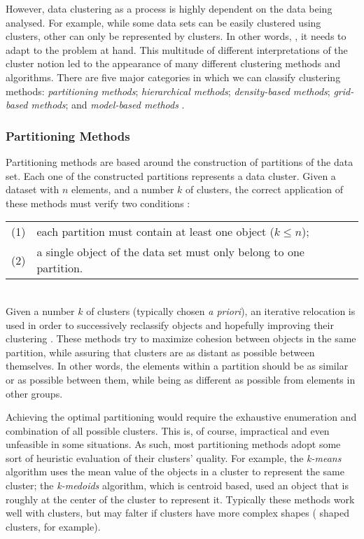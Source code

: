 However, data clustering as a process is highly dependent on the data being
analysed. For example, while some data sets can be easily clustered using
 clusters, other can only be represented by  clusters.
In other words,  \cite{Estivill-Castro:2002:WSM:568574.568575}, it needs to adapt to
the problem at hand. This multitude of different interpretations of the cluster
notion led to the appearance of many different clustering methods and
algorithms. There are five major categories in which we can classify clustering
methods: \emph{partitioning methods}; \emph{hierarchical methods};
\emph{density-based methods}; \emph{grid-based methods}; and \emph{model-based
methods} \cite{han2006data}.

\subsubsection*{Partitioning Methods}

Partitioning methods are based around the construction of partitions of the data
set. Each one of the constructed partitions represents a data cluster. Given a
dataset with $n$ elements, and a number $k$ of clusters, the correct application
of these methods must verify two conditions \cite{han2006data}:\\

\begin{tabular}{l l}
  (1) & each partition must contain at least one object ($k \leq n$);\\
  (2) & a single object of the data set must only belong to one partition.\\
\end{tabular}\\

Given a number $k$ of clusters (typically chosen \emph{a priori}), an iterative
relocation is used in order to successively reclassify objects and hopefully
improving their clustering \cite{DBLP:journals/corr/abs-1205-1117}. These
methods try to maximize cohesion between objects in the same partition, while
assuring that clusters are as distant as possible between themselves. In other
words, the elements within a partition should be as similar or  as
possible between them, while being as different as possible from elements in
other groups.

Achieving the optimal partitioning would require the exhaustive enumeration and
combination of all possible clusters. This is, of course, impractical and even
unfeasible in some situations. As such, most partitioning methods adopt some
sort of heuristic evaluation of their clusters' quality. For example, the
\emph{k-means} algorithm uses the mean value of the objects in a cluster to
represent the same cluster; the \emph{k-medoids} algorithm, which is
centroid based, used an object that is roughly at the center of the cluster to
represent it. Typically these methods work well with  clusters,
but may falter if clusters have more complex shapes ( shaped
clusters, for example).

